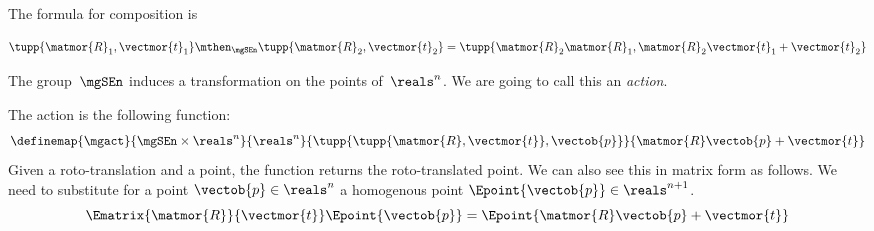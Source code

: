 The formula for composition is

\begin{equation}\label{eq:SE-composition-short}
  \tupp{\matmor{R}_1, \vectmor{t}_1} \mthen_{\mgSEn} \tupp{\matmor{R}_2, \vectmor{t}_2}  = \tupp{\matmor{R}_2 \matmor{R}_1, \matmor{R}_2 \vectmor{t}_1 + \vectmor{t}_2}
\end{equation}

%

The group~$\mgSEn$ induces a transformation on the points of~$\reals^n$.
We are going to call this an \emph{action}.

The action is the following function:
% 
\begin{equation}\label{eq:apply}
\definemap{\mgact}{\mgSEn \times \reals^n}{\reals^n}{\tupp{ \tupp{\matmor{R}, \vectmor{t}}, \vectob{p}}}{\matmor{R}\vectob{p} + \vectmor{t}}
\end{equation}
Given a roto-translation and a point, the function returns the roto-translated point.
%
We can also see this in matrix form as follows. We need to substitute for a point $\vectob{p} \in \reals^n$ a homogenous point
$ \Epoint{\vectob{p}} \in \reals^{n+1}$.
%
\begin{equation}\label{eq:homogenous}
\Ematrix{\matmor{R}}{\vectmor{t}}
\Epoint{\vectob{p}}
 =
 \Epoint{\matmor{R}\vectob{p} + \vectmor{t}}
\end{equation}



